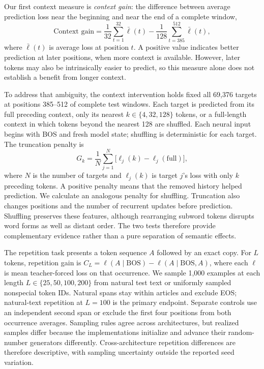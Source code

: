 \documentclass[10pt]{article}
\begin{document}
Our first context measure is \emph{context gain}: the difference between average prediction loss near the beginning and near the end of a complete window,
\begin{equation}
\text{Context gain}=\frac{1}{32}\sum_{t=1}^{32}\bar\ell(t)
-\frac{1}{128}\sum_{t=385}^{512}\bar\ell(t),
\label{eq:cg}
\end{equation}
where $\bar\ell(t)$ is average loss at position $t$. A positive value indicates better prediction at later positions, when more context is available. However, later tokens may also be intrinsically easier to predict, so this measure alone does not establish a benefit from longer context.

To address that ambiguity, the context intervention holds fixed all 69,376 targets at positions 385--512 of complete test windows. Each target is predicted from its full preceding context, only its nearest $k\in\{4,32,128\}$ tokens, or a full-length context in which tokens beyond the nearest 128 are shuffled. Each neural input begins with BOS and fresh model state; shuffling is deterministic for each target. The truncation penalty is
\begin{equation}
G_k=\frac1N\sum_{j=1}^N\bigl[\ell_j(k)-\ell_j(\mathrm{full})\bigr],
\label{eq:intervention}
\end{equation}
where $N$ is the number of targets and $\ell_j(k)$ is target $j$'s loss with only $k$ preceding tokens. A positive penalty means that the removed history helped prediction. We calculate an analogous penalty for shuffling. Truncation also changes positions and the number of recurrent updates before prediction. Shuffling preserves these features, although rearranging subword tokens disrupts word forms as well as distant order. The two tests therefore provide complementary evidence rather than a pure separation of semantic effects.

The repetition task presents a token sequence $A$ followed by an exact copy. For $L$ tokens, repetition gain is $C_L=\ell(A\mid\mathrm{BOS})-\ell(A\mid\mathrm{BOS},A)$, where each $\ell$ is mean teacher-forced loss on that occurrence. We sample 1,000 examples at each length $L\in\{25,50,100,200\}$ from natural test text or uniformly sampled nonspecial token IDs. Natural spans stay within articles and exclude EOS; natural-text repetition at $L=100$ is the primary endpoint. Separate controls use an independent second span or exclude the first four positions from both occurrence averages. Sampling rules agree across architectures, but realized samples differ because the implementations initialize and advance their random-number generators differently. Cross-architecture repetition differences are therefore descriptive, with sampling uncertainty outside the reported seed variation.
\end{document}
